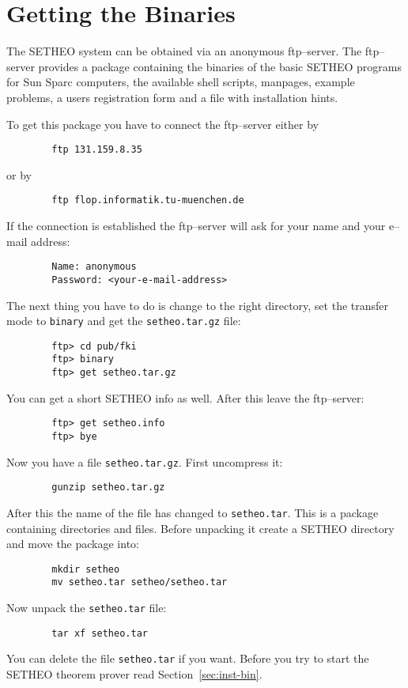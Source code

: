 %
\section{Getting the Binaries}\label{sec:get-bin}

The SETHEO system can be obtained via an anonymous ftp--server. The
ftp--server provides a 
package containing the binaries of the basic SETHEO programs for Sun
Sparc computers, the available shell scripts, manpages, example
problems, a users registration form and a file with
installation hints. 

To get this package you have to connect the ftp--server either by
\begin{verbatim}
        ftp 131.159.8.35
\end{verbatim}
or by
\begin{verbatim}
        ftp flop.informatik.tu-muenchen.de
\end{verbatim}
If the connection is established the ftp--server will ask for your
name and your e--mail address:
\begin{verbatim}
        Name: anonymous
        Password: <your-e-mail-address>
\end{verbatim}
The next thing you have to do is change to the right directory, set
the transfer mode to {\tt binary} and get the {\tt setheo.tar.gz}
file: 
\begin{verbatim}
        ftp> cd pub/fki
        ftp> binary
        ftp> get setheo.tar.gz
\end{verbatim}
You can get a short SETHEO info as well. After this leave the
ftp--server: 
\begin{verbatim}
        ftp> get setheo.info
        ftp> bye
\end{verbatim}

Now you have a file {\tt setheo.tar.gz}. First uncompress it:
\begin{verbatim}
        gunzip setheo.tar.gz
\end{verbatim}
After this the name of the file has changed to {\tt setheo.tar}. This
is a package containing directories and files. Before unpacking it
create a SETHEO directory and move the package into:
\begin{verbatim}
        mkdir setheo
        mv setheo.tar setheo/setheo.tar
\end{verbatim}
Now unpack the {\tt setheo.tar} file:
\begin{verbatim}
        tar xf setheo.tar
\end{verbatim}
You can delete the file {\tt setheo.tar} if you want. Before you try
to start the SETHEO theorem prover read
Section~\ref{sec:inst-bin}. 
